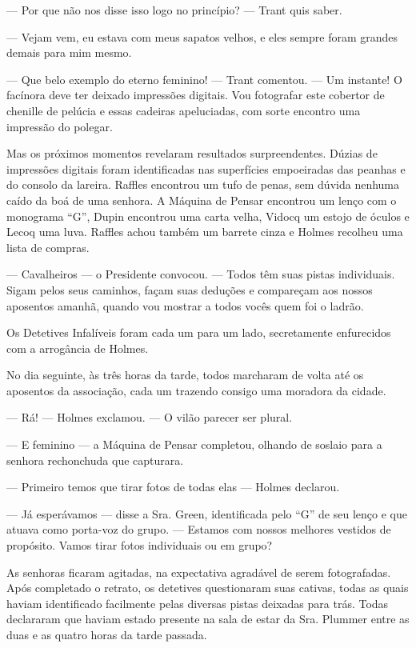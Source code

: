 --- Por que não nos disse isso logo no princípio? --- Trant quis saber.

--- Vejam vem, eu estava com meus sapatos velhos, e eles sempre foram
grandes demais para mim mesmo.

--- Que belo exemplo do eterno feminino! --- Trant comentou. --- Um
instante! O facínora deve ter deixado impressões digitais. Vou
fotografar este cobertor de chenille de pelúcia e essas cadeiras
apeluciadas, com sorte encontro uma impressão do polegar.

Mas os próximos momentos revelaram resultados surpreendentes. Dúzias de
impressões digitais foram identificadas nas superfícies empoeiradas das
peanhas e do consolo da lareira. Raffles encontrou um tufo de penas, sem
dúvida nenhuma caído da boá de uma senhora. A Máquina de Pensar
encontrou um lenço com o monograma ``G'', Dupin encontrou uma carta
velha, Vidocq um estojo de óculos e Lecoq uma luva. Raffles achou também
um barrete cinza e Holmes recolheu uma lista de compras.

--- Cavalheiros --- o Presidente convocou. --- Todos têm suas pistas
individuais. Sigam pelos seus caminhos, façam suas deduções e compareçam
aos nossos aposentos amanhã, quando vou mostrar a todos vocês quem foi o
ladrão.

Os Detetives Infalíveis foram cada um para um lado, secretamente
enfurecidos com a arrogância de Holmes.

No dia seguinte, às três horas da tarde, todos marcharam de volta até os
aposentos da associação, cada um trazendo consigo uma moradora da
cidade.

--- Rá! --- Holmes exclamou. --- O vilão parecer ser plural.

--- E feminino --- a Máquina de Pensar completou, olhando de soslaio
para a senhora rechonchuda que capturara.

--- Primeiro temos que tirar fotos de todas elas --- Holmes declarou.

--- Já esperávamos --- disse a Sra. Green, identificada pelo ``G'' de
seu lenço e que atuava como porta-voz do grupo. --- Estamos com nossos
melhores vestidos de propósito. Vamos tirar fotos individuais ou em
grupo?

As senhoras ficaram agitadas, na expectativa agradável de serem
fotografadas. Após completado o retrato, os detetives questionaram suas
cativas, todas as quais haviam identificado facilmente pelas diversas
pistas deixadas para trás. Todas declararam que haviam estado presente
na sala de estar da Sra. Plummer entre as duas e as quatro horas da
tarde passada.

